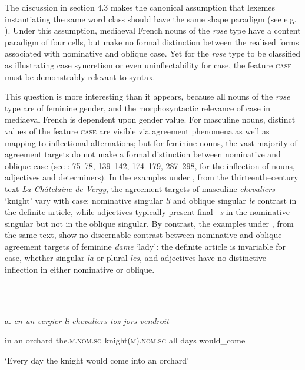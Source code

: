 \documentclass[output=paper]{langscibook}
\begin{document}
The discussion in section 4.3 makes the canonical assumption that lexemes instantiating the same word class should have the same shape paradigm (see e.g. \citealt{Corbett2009}). Under this assumption, mediaeval French nouns of the \textit{rose} type have a content paradigm of four cells, but make no formal distinction between the realised forms associated with nominative and oblique case. Yet for the \textit{rose} type to be classified as illustrating case syncretism or even uninflectability for case, the feature \textsc{case} must be demonstrably relevant to syntax. 

This question is more interesting than it appears, because all nouns of the \textit{rose} type are of feminine gender, and the morphosyntactic relevance of case in mediaeval French is dependent upon gender value. For masculine nouns, distinct values of the feature \textsc{case} are visible via agreement phenomena as well as mapping to inflectional alternations; but for feminine nouns, the vast majority of agreement targets do not make a formal distinction between nominative and oblique case (see \citealt{Buridant2019}: 75–78, 139–142, 174–179, 287–298, for the inflection of nouns, adjectives and determiners). In the examples under , from the thirteenth–century text \textit{La Châtelaine de Vergy}, the agreement targets of masculine \textit{chevaliers} ‘knight’ vary with case: nominative singular \textit{li} and oblique singular \textit{le} contrast in the definite article, while adjectives typically present final –\textit{s} in the nominative singular but not in the oblique singular. By contrast, the examples under , from the same text, show no discernable contrast between nominative and oblique agreement targets of feminine \textit{dame} ‘lady’: the definite article is invariable for case, whether singular \textit{la} or plural \textit{les}, and adjectives have no distinctive inflection in either nominative or oblique.

\ea%
    \label{ex:key:6}
    \gll \\
         \\
    \glt
    \z %

         a. \textit{en un vergier li     chevaliers   toz jors vendroit}

in an orchard the.\textsc{m.nom.sg}   knight(\textsc{m).nom.sg}   all days would\_come

‘Every day the knight would come into an orchard’
\end{document}
